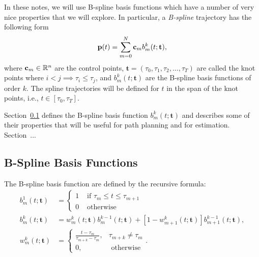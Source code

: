 In these notes, we will use B-spline basis functions which have a number of very nice properties that we will explore.  In particular, a {\em B-spline} trajectory has the following form
\[
\mathbf{p}(t) = \sum_{m=0}^{N} \mathbf{c}_m b_m^k(t;\mathbf{t}),
\]
where $\mathbf{c}_m\in\mathbb{R}^n$ are the control points,  $\mathbf{t}=(\tau_0, \tau_1, \tau_2, \dots, \tau_T)$ are called the knot points where $i<j \implies \tau_i\leq \tau_j$, and $b_m^k(t;\mathbf{t})$ are the B-spline basis functions of order $k$. The spline trajectories will be defined for $t$ in the span of the knot points, i.e., $t\in[\tau_0, \tau_T]$.  

Section~\ref{sec:b-spline-basis-functions} defines the B-spline basis function $b_m^k(t; \mathbf{t})$ and describes some of their properties that will be useful for path planning and for estimation.
Section~...

\subsection{B-Spline Basis Functions}
\label{sec:b-spline-basis-functions}

The B-spline basis function are defined by the recursive formula:
\begin{align}
b_m^1(t; \mathbf{t}) &= \begin{cases} 1 & \text{~if~} \tau_m \leq t \leq \tau_{m+1} \\ 
 									 0 & \text{~otherwise} 
 					   \end{cases} 
	\label{eq:spline_basis_definition_0}\\	
b_m^k(t; \mathbf{t}) &= w_m^k(t; \mathbf{t}) b_m^{k-1}(t; \mathbf{t}) + \left[1-w_{m+1}^k(t; \mathbf{t})\right] b_{m+1}^{k-1}(t; \mathbf{t}),
	\label{eq:spline_basis_definition_k} \\
w_m^k(t; \mathbf{t}) &= \begin{cases}
                      		\frac{t-\tau_m}{\tau_{m+k}-\tau_m}, & \tau_{m+k}\neq \tau_m \\
                      		0, & \text{~otherwise} 
                        \end{cases}.
\end{align}

\par{}

